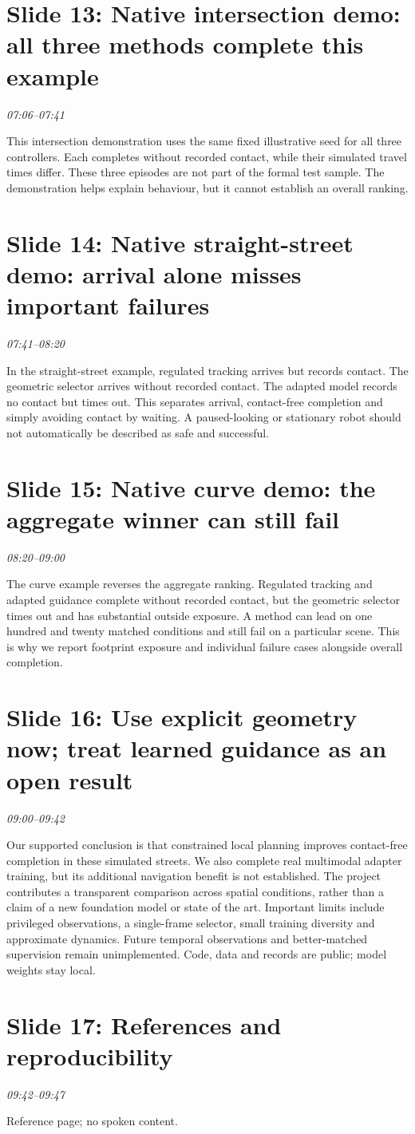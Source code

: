 \documentclass[a4paper,11pt]{article}
\begin{document}
\section*{Slide 13: Native intersection demo: all three methods complete this example}
\textit{07:06--07:41}

This intersection demonstration uses the same fixed illustrative seed for all three controllers. Each completes without recorded contact, while their simulated travel times differ. These three episodes are not part of the formal test sample. The demonstration helps explain behaviour, but it cannot establish an overall ranking.

\section*{Slide 14: Native straight-street demo: arrival alone misses important failures}
\textit{07:41--08:20}

In the straight-street example, regulated tracking arrives but records contact. The geometric selector arrives without recorded contact. The adapted model records no contact but times out. This separates arrival, contact-free completion and simply avoiding contact by waiting. A paused-looking or stationary robot should not automatically be described as safe and successful.

\section*{Slide 15: Native curve demo: the aggregate winner can still fail}
\textit{08:20--09:00}

The curve example reverses the aggregate ranking. Regulated tracking and adapted guidance complete without recorded contact, but the geometric selector times out and has substantial outside exposure. A method can lead on one hundred and twenty matched conditions and still fail on a particular scene. This is why we report footprint exposure and individual failure cases alongside overall completion.

\section*{Slide 16: Use explicit geometry now; treat learned guidance as an open result}
\textit{09:00--09:42}

Our supported conclusion is that constrained local planning improves contact-free completion in these simulated streets. We also complete real multimodal adapter training, but its additional navigation benefit is not established. The project contributes a transparent comparison across spatial conditions, rather than a claim of a new foundation model or state of the art. Important limits include privileged observations, a single-frame selector, small training diversity and approximate dynamics. Future temporal observations and better-matched supervision remain unimplemented. Code, data and records are public; model weights stay local.

\section*{Slide 17: References and reproducibility}
\textit{09:42--09:47}

Reference page; no spoken content.
\end{document}
